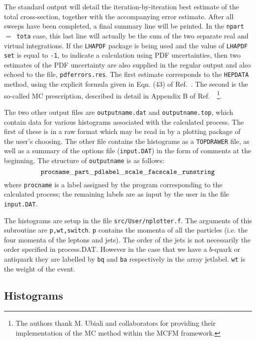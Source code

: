 \documentclass[12pt]{article}
\begin{document}
The standard output will detail the iteration-by-iteration best estimate
of the total cross-section, together with the accompanying error estimate.
After all sweeps have been completed, a final summary line will be printed.
In the {\tt npart}~$=$~{\tt tota} case, this last line will actually be the
sum of the two separate real and virtual integrations.
If the {\tt LHAPDF} package is being used and the value of
{\tt LHAPDF set} is equal to {\tt -1},  to indicate a calculation using
PDF uncertainties, then two estimates of the PDF uncertainty are
also supplied in the regular output and also echoed to the file,
{\tt pdferrors.res}. The first estimate corresponds to the
{\tt HEPDATA} method, using the explicit formula given in
Eqn. (43) of Ref.~\cite{Campbell:2006wx}. The second is the so-called
MC prescription, described in detail in Appendix B of
Ref.~\cite{Ball:2008by}~\footnote{
The authors thank M. Ubiali and collaborators for providing their
implementation of the MC method within the MCFM framework.}.


The two other output files are {\tt outputname.dat} and
{\tt outputname.top}, which contain data for various histograms associated
with the calculated process. The first of these is in a raw format 
which may be read in by a plotting package of the user's choosing. The
other file contains the histograms as a {\tt TOPDRAWER} file, as well
as a summary of the options file ({\tt input.DAT}) in the form of
comments at the beginning. The structure
of {\tt outputname} is as follows:
\begin{displaymath}
{\tt procname\_part\_pdlabel\_scale\_facscale\_runstring}
\end{displaymath}
where {\tt procname} is a label assigned by the program corresponding to
the calculated process; the remaining labels are as input by the user
in the file {\tt input.DAT}.

The histograms are  setup in the file {\tt src/User/nplotter.f}. The arguments of this
subroutine are { \tt p,wt,switch}. {\tt p} contains the momenta of all the particles
(i.e. the four momenta of the leptons and jets). The order of the jets is not
necessarily the  order specified in process.DAT.  However in the case that we have a 
$b$-quark or antiquark they are labelled by {\tt bq} and {\tt ba} respectively
in the array jetlabel. {\tt wt} is the weight of the event.  

\subsection{Histograms}
\label{sec:histos}
\end{document}
